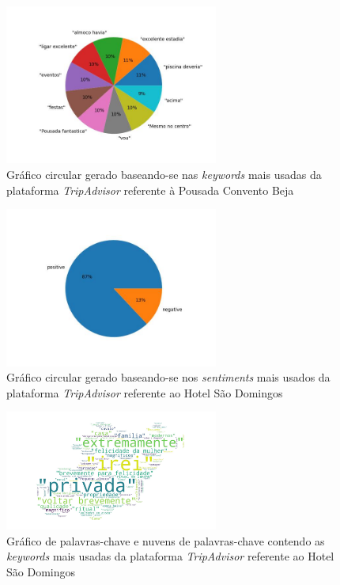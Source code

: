 \begin{figure}[!htb]
\centering
\includegraphics[width=7cm]{figuras/TripAdvisor/Hotels/hotel0_keywords.jpeg}
\caption{Gráfico circular gerado baseando-se nas \textit{keywords} mais usadas da plataforma \textit{TripAdvisor} referente à Pousada Convento Beja}
\label{fig:exemplofig}
\end{figure}

\begin{figure}[!htb]
\centering
\includegraphics[width=7cm]{figuras/TripAdvisor/Hotels/hotel8_sentiments.jpeg}
\caption{Gráfico circular gerado baseando-se nos \textit{sentiments} mais usados da plataforma \textit{TripAdvisor} referente ao Hotel São Domingos}
\label{fig:exemplofig}
\end{figure}

\begin{figure}[!htb]
\centering
\includegraphics[width=7cm]{figuras/TripAdvisor/Hotels/hotel8_keywordcloud.jpeg}
\caption{Gráfico de palavras-chave e nuvens de palavras-chave contendo as \textit{keywords} mais usadas da plataforma \textit{TripAdvisor} referente ao Hotel São Domingos}
\label{fig:exemplofig}
\end{figure}

